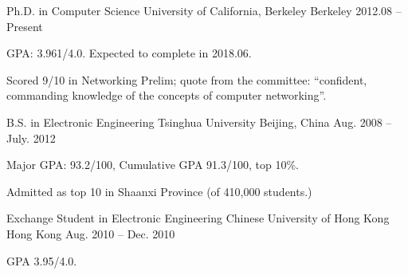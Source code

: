 

\begin{cventries}

  \cventry
  {Ph.D. in Computer Science}
  {University of California, Berkeley}
  {Berkeley}
  {2012.08 -- Present}
  {
    \begin{cvitems}
    \item GPA: 3.961/4.0. Expected to complete in 2018.06.
    \item Scored 9/10 in Networking Prelim; quote from the committee:
      ``confident, commanding knowledge of the concepts of computer
      networking''.
    \end{cvitems}
  }

  \cventry
  {B.S. in Electronic Engineering}
  {Tsinghua University}
  {Beijing, China}
  {Aug. 2008 -- July. 2012}
  {
    \begin{cvitems}
    \item{Major GPA: 93.2/100, Cumulative GPA 91.3/100, top 10\%.}
    \item{Admitted as top 10 in Shaanxi Province (of 410,000 students.)}
    \end{cvitems}
  }

  \cventry
  {Exchange Student in Electronic Engineering}
  {Chinese University of Hong Kong}
  {Hong Kong}
  {Aug. 2010 -- Dec. 2010}
  {
    \begin{cvitems}
    \item {GPA 3.95/4.0.}
    \end{cvitems}
  }

\end{cventries}

